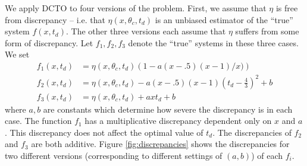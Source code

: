 \documentclass[12pt]{article}
\begin{document}
% 
We apply DCTO to four versions of the problem.
%
First, we assume that $\eta$ is free from discrepancy -- i.e. that $\eta(x,\theta_c,t_d)$ is an unbiased estimator of the ``true'' system $f(x,t_d)$.
%
The other three versions each assume that $\eta$ suffers from some form of discrepancy.
%
Let $f_1,f_2,f_3$ denote the ``true'' systems in these three cases.
%
We set 
\begin{align*}
	f_1(x,t_d) &= \eta(x,\theta_c,t_d) \left(1-a(x-.5)(x-1)/x) \right) \\
	f_2(x,t_d)&= \eta(x,\theta_c,t_d) - a(x-.5)(x-1)\left(t_d-\frac43\right)^2 + b\\
	f_3(x,t_d)&=\eta(x,\theta_c,t_d) + axt_d+b
\end{align*}
%
where $a,b$ are constants which determine how severe the discrepancy is in each case. 
%
The function $f_1$ has a multiplicative discrepancy dependent only on $x$ and $a$. 
%
This discrepancy does not affect the optimal value of $t_d$.  
%
The discrepancies of $f_2$ and $f_3$ are both additive.
%
Figure \ref{fig:discrepancies} shows the discrepancies for two different versions (corresponding to different settings of $(a,b)$) of each $f_i$.
%
\end{document}
